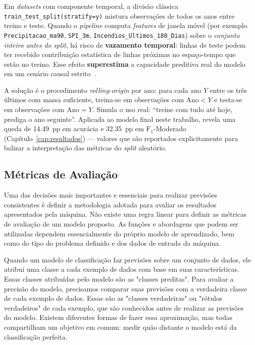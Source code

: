 Em \emph{datasets} com componente temporal, a divisão clássica \texttt{train\_test\_split(stratify=y)} mistura observações de todos os anos entre treino e teste. Quando o \emph{pipeline} computa \emph{features} de janela móvel (por exemplo \texttt{Precipitacao\_ma90}, \texttt{SPI\_3m}, \texttt{Incendios\_Ultimos\_180\_Dias}) sobre o \emph{conjunto inteiro antes do} \emph{split}, há risco de \textbf{vazamento temporal}: linhas de teste podem ter recebido contribuição estatística de linhas próximas no espaço-tempo que estão no treino. Esse efeito \textbf{superestima} a capacidade preditiva real do modelo em um cenário causal estrito~\cite{bergmeir2012cv}.

A solução é o procedimento \emph{rolling-origin} por ano: para cada ano \(Y\) entre os três últimos com massa suficiente, treina-se em observações com \(\text{Ano} < Y\) e testa-se em observações com \(\text{Ano} = Y\). Simula o uso real: ``treine com tudo até hoje, prediga o ano seguinte''. Aplicada ao modelo final neste trabalho, revela uma queda de \SI{14,49}{pp} em acurácia e \SI{32,35}{pp} em \(\text{F}_1\)-Moderado (Capítulo~\ref{cap:resultados}) --- valores que são reportados explicitamente para balizar a interpretação das métricas do \emph{split} aleatório.

\subsection{Métricas de Avaliação}

Uma das decisões mais importantes e essenciais para realizar previsões consistentes é definir a metodologia adotada para avaliar os resultados apresentados pela máquina. Não existe uma regra linear para definir as métricas de avaliação de um modelo proposto. As funções e abordagens que podem ser utilizadas dependem essencialmente do próprio modelo de aprendizado, bem como do tipo do problema definido e dos dados de entrada da máquina.

Quando um modelo de classificação faz previsões sobre um conjunto de dados, ele atribui uma classe a cada exemplo de dados com base em suas características. Essas classes atribuídas pelo modelo são as "classes preditas". Para avaliar a precisão do modelo, precisamos comparar suas previsões com a verdadeira classe de cada exemplo de dados. Essas são as "classes verdadeiras" ou "rótulos verdadeiros" de cada exemplo, que são conhecidos antes de realizar as previsões do modelo. Existem diferentes formas de fazer essa aproximação, mas todas compartilham um objetivo em comum: medir quão distante o modelo está da classificação perfeita.

